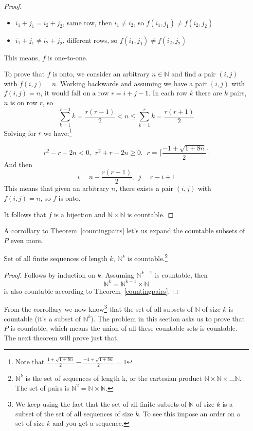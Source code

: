 \begin{proof}
\begin{itemize}
\item $i_1+j_1=i_2+j_2$, same row, then $i_1 \ne i_2$, so $f(i_1, j_1) \ne f(i_2, j_2)$
\item $i_1+j_1 \ne i_2+j_2$, different rows, so $f(i_1, j_1) \ne f(i_2, j_2)$
\end{itemize}

This means, $f$ is one-to-one.

To prove that $f$ is onto, we consider an arbitrary $n \in \mathbb{N}$ and find a pair $(i, j)$ with $f(i, j)=n$. Working backwards and assuming we have a pair $(i, j)$ with $f(i, j)=n$, it would fall on a row $r = i + j - 1$. In each row $k$ there are $k$ pairs, $n$ is on row $r$, so
$$
\sum_{k=1}^{r-1} k = \frac{r(r-1)}{2} < n \leq \sum_{k=1}^{r} k = \frac{r(r+1)}{2}
$$
Solving for $r$ we have:\footnote{Note that $\frac{1 + \sqrt{1 + 8 n}}{2} - \frac{-1 + \sqrt{1 + 8 n}}{2} = 1$}

$$
r^2 - r - 2n < 0, ~~r^2 + r - 2n \geq 0, ~~r = \bigg\lceil \frac{-1 + \sqrt{1 + 8 n}}{2} \bigg\rceil
$$
And then
$$
i = n - \frac{r(r - 1)}{2}, ~~j = r - i + 1
$$
This means that given an arbitrary $n$, there exists a pair $(i, j)$ with $f(i, j)=n$, so $f$ is onto.

It follows that $f$ is a bijection and $\mathbb{N} \times \mathbb{N}$ is countable.
\end{proof}

A corrollary to Theorem~\ref{countingpairs} let's us expand the countable subsets of $P$ even more.

\begin{cor}
Set of all finite sequences of length $k$, $\mathbb{N}^k$ is countable.\footnote{$\mathbb{N}^k$ is the set of sequences of length k, or the cartesian product 
$\mathbb{N} \times \mathbb{N} \times \dots \mathbb{N}$. The set of pairs is $\mathbb{N}^2=\mathbb{N} \times \mathbb{N}$.}
\end{cor}

\begin{proof}
Follows by induction on $k$: Assuming $\mathbb{N}^{k - 1}$ is countable, then
$$
\mathbb{N}^k = \mathbb{N}^{k - 1} \times \mathbb{N}
$$
is also countable according to Theorem~\ref{countingpairs}.
\end{proof}

From the corrollary we now know\footnote{We keep using the fact that the set of all finite subsets of $\mathbb{N}$ of size $k$ is a subset of the set of all sequences of size $k$. To see this impose an order on a set of size $k$ and you get a sequence.} that the set of all subsets of $\mathbb{N}$ of size $k$ is countable (it's a subset of $\mathbb{N}^k$). The problem in this section asks us to prove that $P$ is countable, which means the union of all these countable sets is countable. The next theorem will prove just that.

